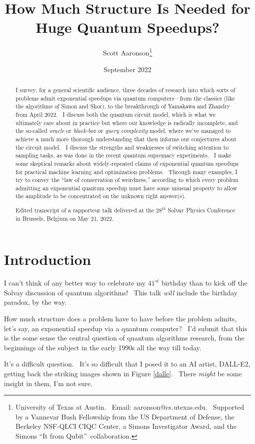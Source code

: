 \documentclass[11pt]{article}
\title{How Much Structure Is Needed for Huge Quantum Speedups?}
\author{Scott Aaronson\thanks{University of Texas at Austin. \ Email:
aaronson@cs.utexas.edu. \ Supported by a Vannevar Bush Fellowship from the US
Department of Defense, the Berkeley NSF-QLCI CIQC Center, a Simons Investigator Award, and the Simons
\textquotedblleft It from Qubit\textquotedblright\ collaboration.}}
\date{September 2022}
\begin{document}
\maketitle

\begin{abstract}
I survey, for a general scientific audience, three decades of research into
which sorts of problems admit exponential speedups via quantum
computers---from the classics (like the algorithms of Simon and
Shor), to the breakthrough of Yamakawa and
Zhandry from April 2022. \ I discuss both the quantum circuit model,
which is what we ultimately care about in practice but where our
knowledge is radically incomplete, and the so-called \emph{oracle} or
\emph{black-box} or \emph{query complexity} model, where we've managed to
achieve a much more thorough understanding that then informs our
conjectures about the circuit model. \ I discuss the strengths and
weaknesses of switching attention to sampling tasks, as was done in
the recent quantum supremacy experiments. \ I make some
skeptical remarks about widely-repeated claims of exponential quantum
speedups for practical machine learning and optimization problems. \
Through many examples, I try to convey the ``law of conservation
of weirdness,'' according to which every problem admitting an exponential
quantum speedup must have some unusual property to allow the amplitude
to be concentrated on the unknown right answer(s).

Edited transcript of a rapporteur talk delivered at the $28^{th}$ Solvay Physics Conference in Brussels, Belgium on May 21, 2022.
\end{abstract}

\section{Introduction}

I can't think of any better way to celebrate my $41^{st}$ birthday than to kick off the Solvay discussion of quantum algorithms! \ This talk \emph{will} include the birthday paradox, by the way.

How much structure does a problem have to have before the problem admits, let's say, an exponential speedup via a quantum computer? \ I'd submit that this is the some sense the central question of quantum algorithms research, from the beginnings of the subject in the early 1990s all the way till today.

It's a difficult question. \ It's so difficult that I posed it to an AI artist, DALL-E2, getting back the striking images shown in Figure \ref{dalle}. \ There \emph{might} be some insight in them, I'm not sure.
\end{document}
